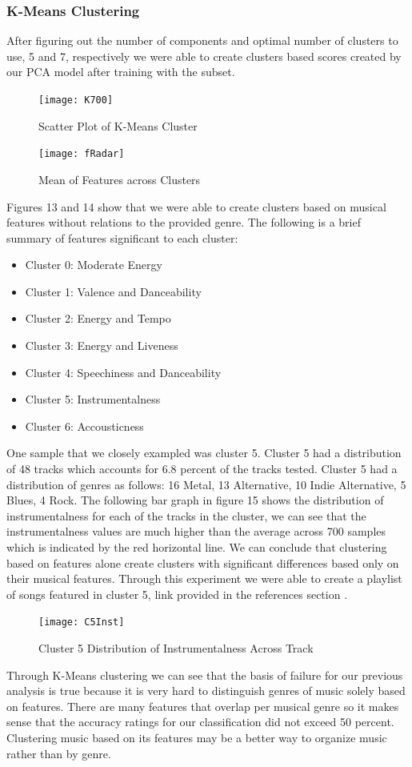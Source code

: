\documentclass[11pt, a4paper, twocolumn]{article}
\begin{document}
\subsubsection{K-Means Clustering}
After figuring out the number of components and optimal number of clusters to use, 5 and 7, respectively we were able to create clusters based scores created by our PCA model after training with the subset. 
\begin{figure}[htb!]
\centerline{\texttt{[image: K700]}}
\caption{Scatter Plot of K-Means Cluster}
\end{figure}
\begin{figure}[htb!]
\centerline{\texttt{[image: fRadar]}}
\caption{Mean of Features across Clusters}
\end{figure}
Figures 13 and 14 show that we were able to create clusters based on musical features without relations to the provided genre. The following is a brief summary of features significant to each cluster: 
\begin{itemize}
\item Cluster 0: Moderate Energy
\item Cluster 1: Valence and Danceability
\item Cluster 2: Energy and Tempo
\item Cluster 3: Energy and Liveness
\item Cluster 4: Speechiness and Danceability
\item Cluster 5: Instrumentalness
\item Cluster 6: Accousticness 
\end{itemize} 
One sample that we closely exampled was cluster 5. Cluster 5 had a distribution of 48 tracks which accounts for 6.8 percent of the tracks tested. Cluster 5 had a distribution of genres as follows: 16 Metal, 13 Alternative, 10 Indie Alternative, 5 Blues, 4 Rock. The following bar graph in figure 15 shows the distribution of instrumentalness for each of the tracks in the cluster, we can see that the instrumentalness values are much higher than the average across 700 samples which is indicated by the red horizontal line. We can conclude that clustering based on features alone create clusters with significant differences based only on their musical features. Through this experiment we were able to create a playlist of songs featured in cluster 5, link provided in the references section \cite{spotify}.
\begin{figure}[htb!]
\centerline{\texttt{[image: C5Inst]}}
\caption{Cluster 5 Distribution of Instrumentalness Across Track}
\end{figure}
 Through K-Means clustering we can see that the basis of failure for our previous analysis is true because it is very hard to distinguish genres of music solely based on features. There are many features that overlap per musical genre so it makes sense that the accuracy ratings for our classification did not exceed 50 percent. Clustering music based on its features may be a better way to organize music rather than by genre. 
\end{document}
